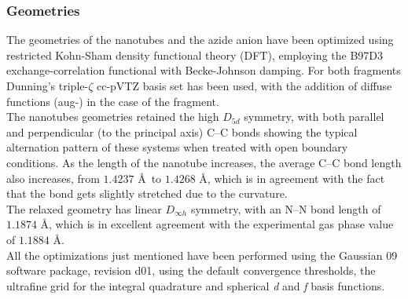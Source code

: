 \documentclass[utf8]{article}
\begin{document}
\subsubsection{Geometries}
The geometries of the nanotubes and the azide anion have been optimized using restricted Kohn-Sham density functional theory (DFT), employing the B97D3 exchange-correlation functional with Becke-Johnson damping\cite{Grimme2010,Grimme2011}.
For both fragments Dunning's triple-$\zeta$ cc-pVTZ basis set\cite{DunningJr1989} has been used, with the addition of diffuse functions (aug-)\cite{Kendall1992} in the case of the \ntm fragment.\\
The nanotubes geometries retained the high $D_{5d}$ symmetry, with both parallel and perpendicular (to the principal axis) C--C bonds showing the typical alternation pattern of these systems when treated with open boundary conditions\cite{Zhou2004,Galano2006}. As the length of the nanotube increases, the average C--C bond length also increases, from $1.4237$ \AA\ to $1.4268$ \AA, which is in agreement with the fact that the bond gets slightly stretched due to the curvature.\\
The relaxed \ntm geometry has linear $D_{\infty h}$ symmetry, with an N--N bond length of $1.1874$ \AA, which is in excellent agreement with the experimental gas phase value of $1.1884$ \AA\cite{Polak1987}.\\
All the optimizations just mentioned have been performed using the Gaussian 09 software package, revision d01\cite{g09}, using the default convergence thresholds, the ultrafine grid for the integral quadrature and spherical \textit{d} and \textit{f} basis functions.
\end{document}
